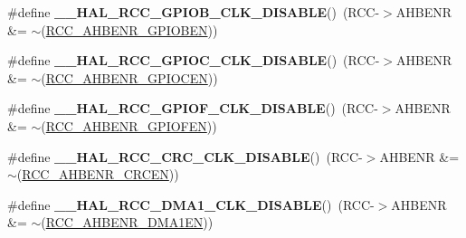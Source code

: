 \begin{DoxyCompactItemize}
\item 
\mbox{\label{group___r_c_c___a_h_b___clock___enable___disable_ga60be1be419b57dafbbb93df67d68a424}} 
\#define {\bfseries \+\_\+\+\_\+\+H\+A\+L\+\_\+\+R\+C\+C\+\_\+\+G\+P\+I\+O\+B\+\_\+\+C\+L\+K\+\_\+\+D\+I\+S\+A\+B\+LE}()~(R\+CC-\/$>$A\+H\+B\+E\+NR \&= $\sim$(\hyperlink{group___peripheral___registers___bits___definition_gab7995351a5b0545e8cd86a228d97dcec}{R\+C\+C\+\_\+\+A\+H\+B\+E\+N\+R\+\_\+\+G\+P\+I\+O\+B\+EN}))
\item 
\mbox{\label{group___r_c_c___a_h_b___clock___enable___disable_ga0fc90c25d35f9b5b5f66961505de1cd4}} 
\#define {\bfseries \+\_\+\+\_\+\+H\+A\+L\+\_\+\+R\+C\+C\+\_\+\+G\+P\+I\+O\+C\+\_\+\+C\+L\+K\+\_\+\+D\+I\+S\+A\+B\+LE}()~(R\+CC-\/$>$A\+H\+B\+E\+NR \&= $\sim$(\hyperlink{group___peripheral___registers___bits___definition_ga7e5c4504b7adbb13372e7536123a756b}{R\+C\+C\+\_\+\+A\+H\+B\+E\+N\+R\+\_\+\+G\+P\+I\+O\+C\+EN}))
\item 
\mbox{\label{group___r_c_c___a_h_b___clock___enable___disable_ga84c2248eab0a30bd8f4912233abbf34a}} 
\#define {\bfseries \+\_\+\+\_\+\+H\+A\+L\+\_\+\+R\+C\+C\+\_\+\+G\+P\+I\+O\+F\+\_\+\+C\+L\+K\+\_\+\+D\+I\+S\+A\+B\+LE}()~(R\+CC-\/$>$A\+H\+B\+E\+NR \&= $\sim$(\hyperlink{group___peripheral___registers___bits___definition_ga9c0de1cc7b72b07f81bce3597a63dc39}{R\+C\+C\+\_\+\+A\+H\+B\+E\+N\+R\+\_\+\+G\+P\+I\+O\+F\+EN}))
\item 
\mbox{\label{group___r_c_c___a_h_b___clock___enable___disable_ga170a30954a78a81a8f9b381378e0c9af}} 
\#define {\bfseries \+\_\+\+\_\+\+H\+A\+L\+\_\+\+R\+C\+C\+\_\+\+C\+R\+C\+\_\+\+C\+L\+K\+\_\+\+D\+I\+S\+A\+B\+LE}()~(R\+CC-\/$>$A\+H\+B\+E\+NR \&= $\sim$(\hyperlink{group___peripheral___registers___bits___definition_gade3ee302bf659a2bfbf75e1a00630242}{R\+C\+C\+\_\+\+A\+H\+B\+E\+N\+R\+\_\+\+C\+R\+C\+EN}))
\item 
\mbox{\label{group___r_c_c___a_h_b___clock___enable___disable_ga569dc8b9e178a8afab2664fdf87f46c5}} 
\#define {\bfseries \+\_\+\+\_\+\+H\+A\+L\+\_\+\+R\+C\+C\+\_\+\+D\+M\+A1\+\_\+\+C\+L\+K\+\_\+\+D\+I\+S\+A\+B\+LE}()~(R\+CC-\/$>$A\+H\+B\+E\+NR \&= $\sim$(\hyperlink{group___peripheral___registers___bits___definition_gac8c3053f1ce37c9f643f0e31471927ea}{R\+C\+C\+\_\+\+A\+H\+B\+E\+N\+R\+\_\+\+D\+M\+A1\+EN}))

\end{DoxyCompactItemize}
